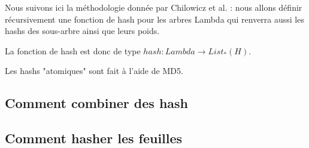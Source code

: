Nous suivons ici la méthodologie donnée par Chilowicz et
al. \cite{chilowicz:hal-00627811}: nous allons définir récursivement
une fonction de hash pour les arbres Lambda qui renverra aussi les
hashs des sous-arbre ainsi que leurs poids.

La fonction de hash est donc de type $hash : Lambda \to List_*(H)$.

Les hashs "atomiques" sont fait à l'aide de MD5.

\subsection{Comment combiner des hash}

\subsection{Comment hasher les feuilles}
